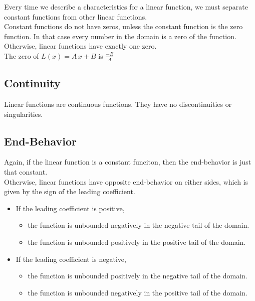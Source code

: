 \documentclass{ximera}
\begin{document}
Every time we describe a characteristics for a linear function, we must separate constant functions from other linear functions. \\

Constant functions do not have zeros, unless the constant function is the zero function.  In that case every number in the domain is a zero of the function. \\


Otherwise, linear functions have exactly one zero. \\

The zero of $L(x) = A \, x + B $ is $\frac{-B}{A}$












\subsection*{Continuity}

Linear functions are continuous functions.  They have no discontinuities or singularities. \\






\subsection*{End-Behavior}


Again, if the linear function is a constant funciton, then the end-behavior is just that constant. \\



Otherwise, linear functions have opposite end-behavior on either sides, which is given by the sign of the leading coefficient. \\


\begin{itemize}
     \item If the leading coefficient is positive,
     \begin{itemize}
          \item the function is unbounded negatively in the negative tail of the domain.
          \item the function is unbounded positively in the positive tail of the domain.
     \end{itemize}
     \item If the leading coefficient is negative,
     \begin{itemize}
          \item the function is unbounded positively in the negative tail of the domain.
          \item the function is unbounded negatively in the positive tail of the domain.
     \end{itemize}
\end{itemize}
\end{document}
